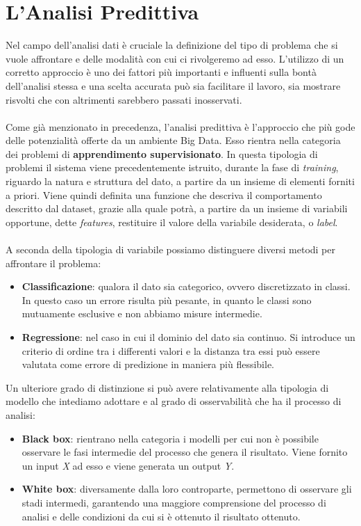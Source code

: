 \chapter{L'Analisi Predittiva}
Nel campo dell'analisi dati è cruciale la definizione del tipo di problema che si vuole affrontare e delle modalità con cui ci rivolgeremo ad esso. L'utilizzo di un corretto approccio è uno dei fattori più importanti e influenti sulla bontà dell'analisi stessa e una scelta accurata può sia facilitare il lavoro, sia mostrare risvolti che con altrimenti sarebbero passati inosservati.\\\\
Come già menzionato in precedenza, l'analisi predittiva \cite{pred_analytics} è l'approccio che più gode delle potenzialità offerte da un ambiente Big Data. Esso rientra nella categoria dei problemi di \textbf{apprendimento supervisionato}.
\newline
In questa tipologia di problemi il sistema viene precedentemente istruito, durante la fase di \textit{training}, riguardo la natura e struttura del dato, a partire da un insieme di elementi forniti a priori. Viene quindi definita una funzione che descriva il comportamento descritto dal dataset, grazie alla quale potrà, a partire da un insieme di variabili opportune, dette \textit{features}, restituire il valore della variabile desiderata, o \textit{label}.\\\\
A seconda della tipologia di variabile possiamo distinguere diversi metodi per affrontare il problema:
\begin{itemize}
	\item \textbf{Classificazione}: qualora il dato sia categorico, ovvero discretizzato in classi. In questo caso un errore risulta più pesante, in quanto le classi sono mutuamente esclusive e non abbiamo misure intermedie.
	
	\item \textbf{Regressione}: nel caso in cui il dominio del dato sia continuo. Si introduce un criterio di ordine tra i differenti valori e la distanza tra essi può essere valutata come errore di predizione in maniera più flessibile. 
\end{itemize}
Un ulteriore grado di distinzione si può avere relativamente alla tipologia di modello che intediamo adottare e al grado di osservabilità che ha il processo di analisi:
\begin{itemize}
	\item \textbf{Black box}: rientrano nella categoria i modelli per cui non è possibile osservare le fasi intermedie del processo che genera il risultato. Viene fornito un input \textit{X} ad esso e viene generata un output \textit{Y}.
	
	\item \textbf{White box}: diversamente dalla loro controparte, permettono di osservare gli stadi intermedi, garantendo una maggiore comprensione del processo di analisi e delle condizioni da cui si è ottenuto il risultato ottenuto.
\end{itemize}

